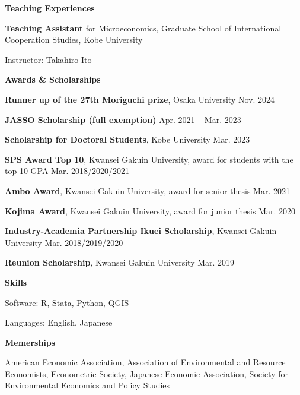 \documentclass{article}
\begin{document}
\hrulefill

\begin{flushleft}
  \textbf{\large{Teaching Experiences}}
\end{flushleft}

\textbf{Teaching Assistant} for Microeconomics, Graduate School of International Cooperation Studies, Kobe University

Instructor: Takahiro Ito

\hrulefill

\begin{flushleft}
  \textbf{\large{Awards \& Scholarships}}
\end{flushleft}

\textbf{Runner up of the 27th Moriguchi prize}, Osaka University \hspace{\fill} Nov. 2024

\textbf{JASSO Scholarship (full exemption)} \hspace{\fill} Apr. 2021 -- Mar. 2023

\textbf{Scholarship for Doctoral Students}, Kobe University \hspace{\fill} Mar. 2023

\textbf{SPS Award Top 10}, Kwansei Gakuin University, award for students with the top 10 GPA \hspace{\fill} Mar. 2018/2020/2021

\textbf{Ambo Award}, Kwansei Gakuin University, award for senior thesis \hspace{\fill} Mar. 2021

\textbf{Kojima Award}, Kwansei Gakuin University, award for junior thesis \hspace{\fill} Mar. 2020

\textbf{Industry-Academia Partnership Ikuei Scholarship}, Kwansei Gakuin University \hspace{\fill} Mar. 2018/2019/2020

\textbf{Reunion Scholarship}, Kwansei Gakuin University \hspace{\fill} Mar. 2019

\hrulefill

\begin{flushleft}
  \textbf{\large{Skills}}
\end{flushleft}

Software: R, Stata, Python, QGIS

Languages: English, Japanese

\hrulefill

\begin{flushleft}
  \textbf{\large{Memerships}}
\end{flushleft}

American Economic Association,
Association of Environmental and Resource Economists,
Econometric Society,
Japanese Economic Association,
Society for Environmental Economics and Policy Studies
\end{document}

